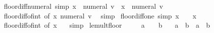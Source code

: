 \begin{isabellebody}
\endisatagproof
{\isafoldproof}%
%
\isadelimproof
\isanewline
%
\endisadelimproof
\isanewline
{}\isamarkupfalse%
\ floor{\isacharunderscore}{\kern0pt}diff{\isacharunderscore}{\kern0pt}numeral\ {\isacharbrackleft}{\kern0pt}simp{\isacharbrackright}{\kern0pt}{\isacharcolon}{\kern0pt}\ {\isachardoublequoteopen}{\isasymlfloor}x\ {\isacharminus}{\kern0pt}\ numeral\ v{\isasymrfloor}\ {\isacharequal}{\kern0pt}\ {\isasymlfloor}x{\isasymrfloor}\ {\isacharminus}{\kern0pt}\ numeral\ v{\isachardoublequoteclose}\isanewline
%
\isadelimproof
\ \ %
\endisadelimproof
%
\isatagproof
{}\isamarkupfalse%
\ floor{\isacharunderscore}{\kern0pt}diff{\isacharunderscore}{\kern0pt}of{\isacharunderscore}{\kern0pt}int\ {\isacharbrackleft}{\kern0pt}of\ x\ {\isachardoublequoteopen}numeral\ v{\isachardoublequoteclose}{\isacharbrackright}{\kern0pt}\ \isamarkupfalse%
\ simp%
\endisatagproof
{\isafoldproof}%
%
\isadelimproof
\isanewline
%
\endisadelimproof
\isanewline
{}\isamarkupfalse%
\ floor{\isacharunderscore}{\kern0pt}diff{\isacharunderscore}{\kern0pt}one\ {\isacharbrackleft}{\kern0pt}simp{\isacharbrackright}{\kern0pt}{\isacharcolon}{\kern0pt}\ {\isachardoublequoteopen}{\isasymlfloor}x\ {\isacharminus}{\kern0pt}\ {}{\isasymrfloor}\ {\isacharequal}{\kern0pt}\ {\isasymlfloor}x{\isasymrfloor}\ {\isacharminus}{\kern0pt}\ {}{\isachardoublequoteclose}\isanewline
%
\isadelimproof
\ \ %
\endisadelimproof
%
\isatagproof
{}\isamarkupfalse%
\ floor{\isacharunderscore}{\kern0pt}diff{\isacharunderscore}{\kern0pt}of{\isacharunderscore}{\kern0pt}int\ {\isacharbrackleft}{\kern0pt}of\ x\ {}{\isacharbrackright}{\kern0pt}\ \isamarkupfalse%
\ simp%
\endisatagproof
{\isafoldproof}%
%
\isadelimproof
\isanewline
%
\endisadelimproof
\isanewline
{}\isamarkupfalse%
\ le{\isacharunderscore}{\kern0pt}mult{\isacharunderscore}{\kern0pt}floor{\isacharcolon}{\kern0pt}\isanewline
\ \ \ {\isachardoublequoteopen}{}\ {\isasymle}\ a{\isachardoublequoteclose}\ \ {\isachardoublequoteopen}{}\ {\isasymle}\ b{\isachardoublequoteclose}\isanewline
\ \ \ {\isachardoublequoteopen}{\isasymlfloor}a{\isasymrfloor}\ {\isacharasterisk}{\kern0pt}\ {\isasymlfloor}b{\isasymrfloor}\ {\isasymle}\ {\isasymlfloor}a\ {\isacharasterisk}{\kern0pt}\ b{\isasymrfloor}{\isachardoublequoteclose}\isanewline
%
\isadelimproof
%
\endisadelimproof
%
\isatagproof
{}\isamarkupfalse%
\ {\isacharminus}{\kern0pt}\isanewline

\end{isabellebody}
